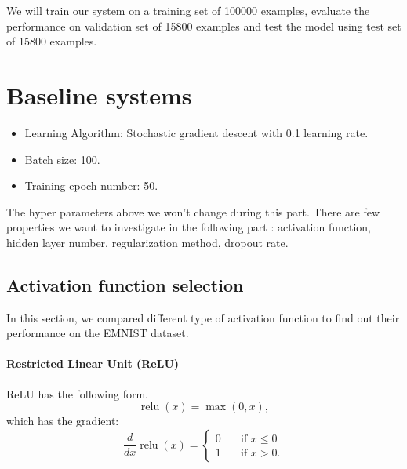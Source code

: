 \documentclass{article}
\DeclareMathOperator{\relu}{relu}
\begin{document}
We will train our system on a training set of 100000 examples,  evaluate the performance on validation set of 15800 examples and test the model using test set of 15800 examples.






\section{Baseline systems} 
\begin{itemize}
	\item Learning Algorithm: Stochastic gradient descent with 0.1 learning rate.
	\item Batch size: 100.
	\item Training epoch number: 50.
\end{itemize}

The hyper parameters above we won't change during this part. There are few properties we want to investigate in the following part : activation function, hidden layer number, regularization method, dropout rate.

\subsection{Activation function selection}
In this section, we compared different type of activation function to find out their performance on the EMNIST dataset.
\paragraph{Restricted Linear Unit (ReLU)}
ReLU \citep{icml2010_NairH10} has the following form.
\begin{equation}
  \relu(x) = \max(0, x) ,
\end{equation} 
which has the gradient:
\begin{equation}
  \frac{d}{dx} \relu(x) =
     \begin{cases} 
      0      & \quad \text{if } x \leq  0 \\
      1       & \quad \text{if } x > 0 .
    \end{cases} 
\end{equation}
\end{document}

